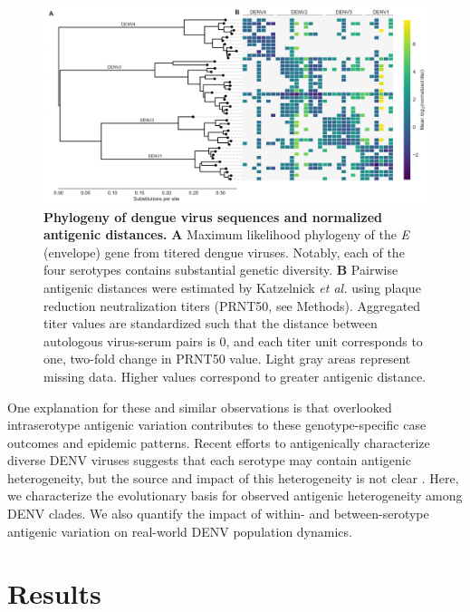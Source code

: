 \documentclass[11pt,oneside,letterpaper]{article}
\begin{document}
\begin{figure}[ht]
  \begin{centering}
    \includegraphics[width=\linewidth]{../figures/png/titer_tree_heatmap.png}
  	\caption{\textbf{Phylogeny of dengue virus sequences and normalized antigenic distances.}
    \textbf{A} Maximum likelihood phylogeny of the \textit{E} (envelope) gene from titered dengue viruses.
    Notably, each of the four serotypes contains substantial genetic diversity.
    \textbf{B} Pairwise antigenic distances were estimated by Katzelnick \textit{et al.} using plaque reduction neutralization titers (PRNT50, see Methods).
    Aggregated titer values are standardized such that the distance between autologous virus-serum pairs is 0, and each titer unit corresponds to one, two-fold change in PRNT50 value.
    Light gray areas represent missing data.
    Higher values correspond to greater antigenic distance.
    }
  	\label{titer_tree_heatmap}
  \end{centering}
\end{figure}

One explanation for these and similar observations is that overlooked intraserotype antigenic variation contributes to these genotype-specific case outcomes and epidemic patterns.
Recent efforts to antigenically characterize diverse DENV viruses suggests that each serotype may contain antigenic heterogeneity, but the source and impact of this heterogeneity is not clear \citep{katzelnick2015dengue}.
Here, we characterize the evolutionary basis for observed antigenic heterogeneity among DENV clades.
We also quantify the impact of within- and between-serotype antigenic variation on real-world DENV population dynamics.

\section*{Results}
\end{document}
